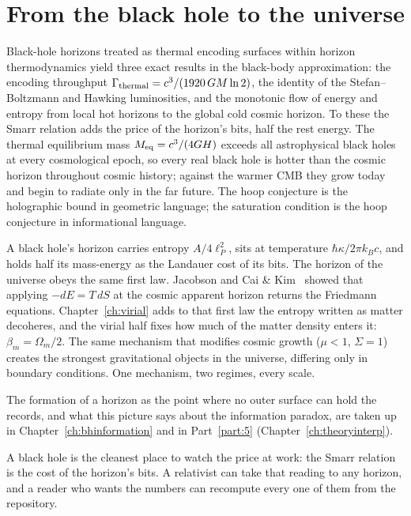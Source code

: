 \section{From the black hole to the universe}\label{sec:bh_universe}
Black-hole horizons treated as thermal encoding surfaces within horizon thermodynamics yield three exact results in the black-body approximation: the
encoding throughput $\Gamma_{\rm thermal}=c^3/(1920\,GM\ln2)$, the identity of the Stefan--Boltzmann and Hawking luminosities, and the monotonic flow of
energy and entropy from local hot horizons to the global cold cosmic horizon. To these the Smarr relation adds the price of the horizon's bits, half the
rest energy. The thermal equilibrium mass $M_{\rm eq}=c^3/(4GH)$ exceeds all astrophysical black holes at every cosmological epoch, so every real black hole
is hotter than the cosmic horizon throughout cosmic history; against the warmer CMB they grow today and begin to radiate only in the far future. The hoop
conjecture is the holographic bound in geometric language; the saturation condition is the hoop conjecture in informational language.

A black hole's horizon carries entropy $A/4\ell_P^2$, sits at temperature $\hbar\kappa/2\pi k_Bc$, and holds half its mass-energy as the Landauer cost of its
bits. The horizon of the universe obeys the same first law. Jacobson and Cai \& Kim~\cite{Jacobson1995,CaiKim2005} showed that applying $-dE=T\,dS$ at the cosmic apparent horizon returns the
Friedmann equations. Chapter~\ref{ch:virial} adds to that first law the entropy written as matter decoheres, and the virial half fixes how much of the matter
density enters it: $\beta_m=\Omega_m/2$. The same mechanism that modifies cosmic growth ($\mu<1$, $\Sigma=1$) creates the strongest gravitational objects in the
universe, differing only in boundary conditions. One mechanism, two regimes, every scale. \interp

The formation of a horizon as the point where no outer surface can hold the records, and what this picture says about the information paradox, are taken
up in Chapter~\ref{ch:bhinformation} and in Part~\ref{part:5} (Chapter~\ref{ch:theoryinterp}).

A black hole is the cleanest place to watch the price at work: the Smarr relation is the cost of the horizon's bits. A relativist can take that reading to any horizon, and a reader who wants the numbers can recompute every one of them from the repository.
